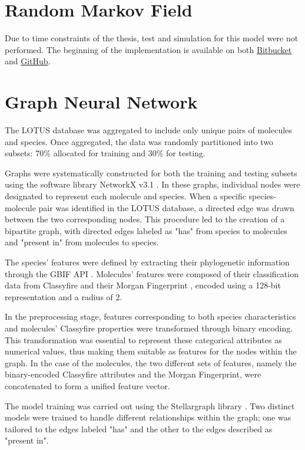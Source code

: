 \documentclass[
11pt, %
oneside, %
english, %
singlespacing, %
headsepline, %
chapterinoneline, %
]{MastersDoctoralThesis} %
\begin{document}
\section{Random Markov Field}
Due to time constraints of the thesis, test and simulation for this model were not performed. The beginning of the implementation is available on both \href{https://bitbucket.org/wegmannlab/metabolite_inference/src/master/}{Bitbucket} and \href{https://github.com/anticipated-lotus/metabolite_inference}{GitHub}.

\section{Graph Neural Network}\label{sec:methods:GNN}
The LOTUS database was aggregated to include only unique pairs of molecules and species. Once aggregated, the data was randomly partitioned into two subsets: 70\% allocated for training and 30\% for testing.

Graphs were systematically constructed for both the training and testing subsets using the software library NetworkX v3.1 \cite{SciPyProceedings_11}. In these graphs, individual nodes were designated to represent each molecule and species. When a specific species-molecule pair was identified in the LOTUS database, a directed edge was drawn between the two corresponding nodes. This procedure led to the creation of a bipartite graph, with directed edges labeled as "has" from species to molecules and "present in" from molecules to species.

The species' features were defined by extracting their phylogenetic information through the GBIF API \cite{GBIF, GbifPygbif2023}. Molecules' features were composed of their classification data from Classyfire \cite{djoumboufeunangClassyFireAutomatedChemical2016} and their Morgan Fingerprint \cite{rogersExtendedConnectivityFingerprints2010}, encoded using a 128-bit representation and a radius of 2.

In the preprocessing stage, features corresponding to both species characteristics and molecules' Classyfire properties were transformed through binary encoding. This transformation was essential to represent these categorical attributes as numerical values, thus making them suitable as features for the nodes within the graph. In the case of the molecules, the two different sets of features, namely the binary-encoded Classyfire attributes and the Morgan Fingerprint, were concatenated to form a unified feature vector.

The model training was carried out using the Stellargraph library \cite{StellarGraphMachineLearning2018}. Two distinct models were trained to handle different relationships within the graph; one was tailored to the edges labeled "has" and the other to the edges described as "present in".
\end{document}
